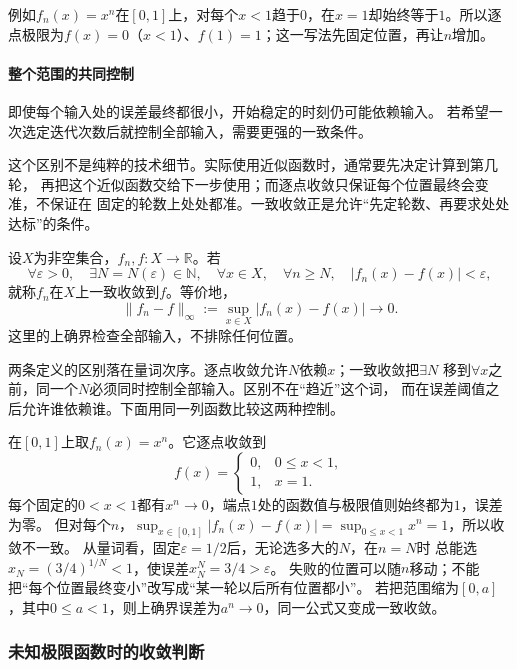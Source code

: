 例如$f_n(x)=x^n$在$[0,1]$上，对每个$x<1$趋于$0$，在$x=1$却始终等于$1$。所以逐点极限为$f(x)=0$（$x<1$）、$f(1)=1$；这一写法先固定位置，再让$n$增加。

\paragraph{整个范围的共同控制}

即使每个输入处的误差最终都很小，开始稳定的时刻仍可能依赖输入。
若希望一次选定迭代次数后就控制全部输入，需要更强的一致条件。

这个区别不是纯粹的技术细节。实际使用近似函数时，通常要先决定计算到第几轮，
再把这个近似函数交给下一步使用；而逐点收敛只保证每个位置最终会变准，不保证在
固定的轮数上处处都准。一致收敛正是允许“先定轮数、再要求处处达标”的条件。
\begin{definition}[函数列的一致收敛]
\label{def:analysis-uniform-convergence}
设$X$为非空集合，$f_n,f:X\to\mathbb R$。若
\[
  \forall\varepsilon>0,\quad
  \exists N=N(\varepsilon)\in\mathbb N,\quad
  \forall x\in X,\quad
  \forall n\geq N,\quad
  |f_n(x)-f(x)|<\varepsilon,
\]
就称$f_n$在$X$上一致收敛到$f$。等价地，
\begin{equation}
  \lVert f_n-f\rVert_{\infty}
  :=
  \sup_{x\in X}|f_n(x)-f(x)|
  \longrightarrow0.
\label{eq:analysis-uniform-convergence}
\end{equation}
这里的上确界检查全部输入，不排除任何位置。
\end{definition}


两条定义的区别落在量词次序。逐点收敛允许$N$依赖$x$；一致收敛把$\exists N$
移到$\forall x$之前，同一个$N$必须同时控制全部输入。区别不在“趋近”这个词，
而在误差阈值之后允许谁依赖谁。下面用同一列函数比较这两种控制。

在$[0,1]$上取$f_n(x)=x^n$。它逐点收敛到
\[
 f(x)=
 \begin{cases}
  0,&0\leq x<1,\\
  1,&x=1.
 \end{cases}
\]
每个固定的$0<x<1$都有$x^n\to0$，端点$1$处的函数值与极限值则始终都为$1$，误差为零。
但对每个$n$，$\sup_{x\in[0,1]}|f_n(x)-f(x)|=\sup_{0\leq x<1}x^n=1$，所以收敛不一致。
从量词看，固定$\varepsilon=1/2$后，无论选多大的$N$，在$n=N$时
总能选$x_N=(3/4)^{1/N}<1$，使误差$x_N^N=3/4>\varepsilon$。
失败的位置可以随$n$移动；不能把“每个位置最终变小”改写成“某一轮以后所有位置都小”。
若把范围缩为$[0,a]$，其中$0\leq a<1$，则上确界误差为$a^n\to0$，同一公式又变成一致收敛。

\subsubsection{未知极限函数时的收敛判断}

